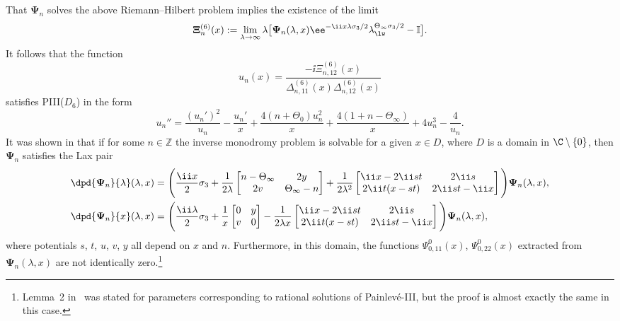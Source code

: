 That $\mathbf{\Psi}_n$ solves the above Riemann--Hilbert problem implies the existence of the limit
\begin{equation}
\label{eq:T-n-definition}
 \mathbf{\Xi}^{(6)}_n(x):=\lim_{\lambda\to\infty}\lambda\big[\mathbf{\Psi}_n(\lambda,x)\ee^{-\ii x\lambda\sigma_3/2}\lambda_{\lw}^{\Theta_\infty\sigma_3/2}-\mathbb{I}\big].
\end{equation}
It follows that the function
\begin{equation}
\label{eq:u-n-recover}
u_n(x) = \dfrac{-\ii \Xi^{(6)}_{n, 12}(x)}{\Delta^{(6)}_{n, 11}(x) \Delta^{(6)}_{n, 12}(x)}
\end{equation}
satisfies PIII($D_6$) in the form
\begin{equation*}\label{eq:PIII-D6-n}
u_n''=\dfrac{(u_n')^2}{u_n}-\dfrac{u_n'}{x}+\dfrac{4(n+\Theta_0)u_n^2}{x}+\dfrac{4(1 + n-\Theta_\infty)}{x}+4u_n^3-\frac{4}{u_n}.
\end{equation*}
It was shown in \cite[Lemma 2]{BMS18} that if for some $n\in\mathbb{Z}$ the inverse monodromy problem is solvable for a given $x \in D$, where $D$ is a domain in $\C \setminus \{0\}$, then $\mathbf{\Psi}_n$ satisfies the Lax pair
\begin{align*}
\dpd{\mathbf{\Psi}_n}{\lambda}(\lambda, x) &= \Bigg( \frac{\ii x}{2}\sigma_3 + \frac{1}{2\lambda}\begin{bmatrix} n-\Theta_\infty & 2y \\ 2v & \Theta_\infty-n \end{bmatrix} + \frac{1}{2\lambda^2} \begin{bmatrix} \ii x - 2\ii st & 2\ii s \\ 2\ii t(x - st) & 2\ii st-\ii x\end{bmatrix} \Bigg) \mathbf{\Psi}_n(\lambda, x), \\
\dpd{\mathbf{\Psi}_n}{x}(\lambda, x) &= \Bigg(\dfrac{\ii \lambda}{2} \sigma_3 + \dfrac{1}{x} \begin{bmatrix} 0 & y \\ v & 0\end{bmatrix} - \dfrac{1}{2\lambda x} \begin{bmatrix} \ii x - 2\ii st & 2\ii s \\ 2\ii t(x -st ) & 2\ii st-\ii x\end{bmatrix}\Bigg)\mathbf{\Psi}_n(\lambda, x),
\end{align*}
where potentials $s$, $t$, $u$, $v$, $y$ all depend on $x$ and $n$. Furthermore, in this domain, the functions $\Psi_{0, 11}^{0}(x)$, $\Psi_{0, 22}^{0}(x)$ extracted from $\mathbf{\Psi}_n(\lambda,x)$ are not identically zero.\footnote{Lemma~2 in~\cite{BMS18} was stated for parameters corresponding to rational solutions of Painlev\'e-III, but the proof is almost exactly the same in this case.}

